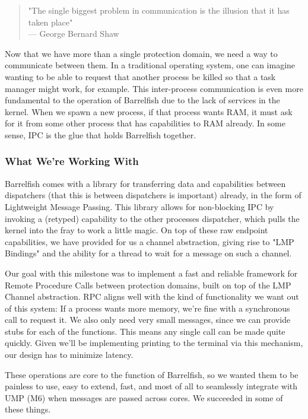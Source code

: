 
\begin{quote}
"The single biggest problem in communication is the illusion that it has taken place" \\
\hspace*{\fill} — George Bernard Shaw 
\end{quote}

Now that we have more than a single protection domain, we need a way to communicate between them. In a traditional operating system, one can imagine wanting to be able to request that another process be killed so that a task manager might work, for example. This inter-process communication is even more fundamental to the operation of Barrelfish due to the lack of services in the kernel. When we spawn a new process, if that process wants RAM, it must ask for it from some other process that has capabilities to RAM already. In some sense, IPC is the glue that holds Barrelfish together. 

\subsubsection*{What We're Working With} \label{wwww}
Barrelfish comes with a library for transferring data and capabilities between dispatchers (that this is between dispatchers is important) already, in the form of Lightweight Message Passing. This library allows for non-blocking IPC by invoking a (retyped) capability to the other processes dispatcher, which pulls the kernel into the fray to work a little magic. On top of these raw endpoint capabilities, we have provided for us a channel abstraction, giving rise to "LMP Bindings" and the ability for a thread to wait for a message on such a channel.

Our goal with this milestone was to implement a fast and reliable framework for Remote Procedure Calls between protection domains, built on top of the LMP Channel abstraction. RPC aligns well with the kind of functionality we want out of this system: If a process wants more memory, we're fine with a synchronous call to request it. We also only need very small messages, since we can provide stubs for each of the functions. This means any single call can be made quite quickly. Given we'll be implementing printing to the terminal via this mechanism, our design has to minimize latency.

These operations are core to the function of Barrelfish, so we wanted them to be painless to use, easy to extend, fast, and most of all to seamlessly integrate with UMP (M6) when messages are passed across cores. We succeeded in some of these things.

